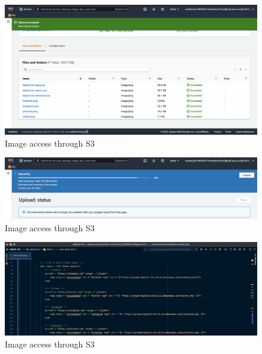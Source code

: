 \begin{figure}
    \centering
    \includegraphics[width=\textwidth]{resources/s3/s3-uploaded.png}
    \caption{Image access through S3}
    \label{fig:s3-uploaded}
\end{figure}


\begin{figure}
    \centering
    \includegraphics[width=\textwidth]{resources/s3/s3-uploading.png}
    \caption{Image access through S3}
    \label{fig:s3-uploading}
\end{figure}


\begin{figure}
    \centering
    \includegraphics[width=\textwidth]{resources/s3/s3-url-change.png}
    \caption{Image access through S3}
    \label{fig:s3-url-change}
\end{figure}


